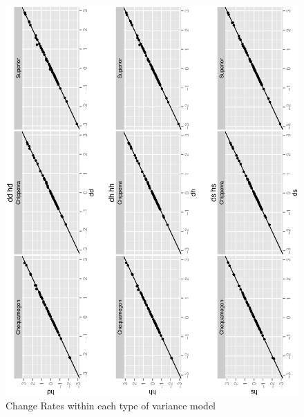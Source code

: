 \documentclass{article}
\begin{document}
\begin{figure}[h!]
\centering
\includegraphics[scale=.6, angle=-90]{rates.ps}
\caption{ Change Rates within each type of variance model}
\end{figure} 
\end{document}
